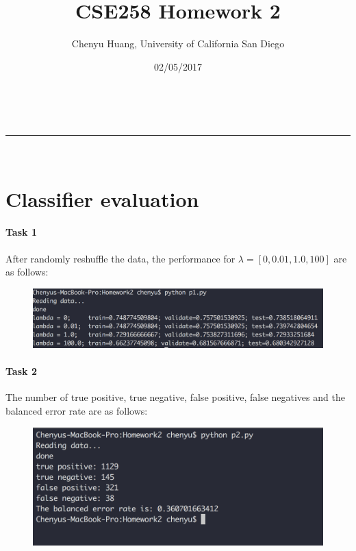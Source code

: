 \documentclass[a4paper,11pt]{article}
\makeatletter
\newcommand{\linia}{\rule{\linewidth}{0.5pt}}
\theoremstyle{mytheor}
\renewcommand{\maketitle}{
\begin{center}
\vspace{2ex}
{\huge \textsc{\@title}}
\vspace{1ex}
\\
\linia\\
\@author \hfill \@date
\vspace{4ex}
\end{center}
}
\makeatother
\begin{document}
\title{CSE258 Homework 2}

\author{Chenyu Huang, University of California San Diego}

\date{02/05/2017}

\maketitle

\section{Classifier evaluation}

\paragraph{Task 1}

After randomly reshuffle the data, the performance for $\lambda=[0, 0.01, 1.0, 100]$ are as follows:
 
\begin{figure}[h]
\centerline{\includegraphics[width=15cm]{p1.png}}
\end{figure}

\paragraph{Task 2}

The number of true positive, true negative, false positive, false negatives and the balanced error rate are as follows:

\begin{figure}[h]
\centerline{\includegraphics[width=15cm]{p2.png}}
\end{figure}
\end{document}
